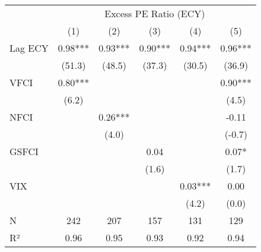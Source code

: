 \begingroup
\fontsize{12.0pt}{14.4pt}\selectfont
\begin{tabular}{lccccc}
\toprule
 & \multicolumn{5}{c}{Excess PE Ratio (ECY)} \\ 
\cmidrule(lr){2-6}
  & (1) & (2) & (3) & (4) & (5) \\ 
\midrule\addlinespace[2.5pt]
Lag ECY & 0.98*** & 0.93*** & 0.90*** & 0.94*** & 0.96*** \\ 
 & (51.3) & (48.5) & (37.3) & (30.5) & (36.9) \\ 
VFCI & 0.80*** &  &  &  & 0.90*** \\ 
 & (6.2) &  &  &  & (4.5) \\ 
NFCI &  & 0.26*** &  &  & -0.11 \\ 
 &  & (4.0) &  &  & (-0.7) \\ 
GSFCI &  &  & 0.04 &  & 0.07* \\ 
 &  &  & (1.6) &  & (1.7) \\ 
VIX &  &  &  & 0.03*** & 0.00 \\ 
{} & {} & {} & {} & {(4.2)} & {(0.0)} \\ 
\midrule\addlinespace[2.5pt]
  N & 242 & 207 & 157 & 131 & 129 \\ 
R² & 0.96 & 0.95 & 0.93 & 0.92 & 0.94 \\ 
\bottomrule
\end{tabular}
\endgroup

